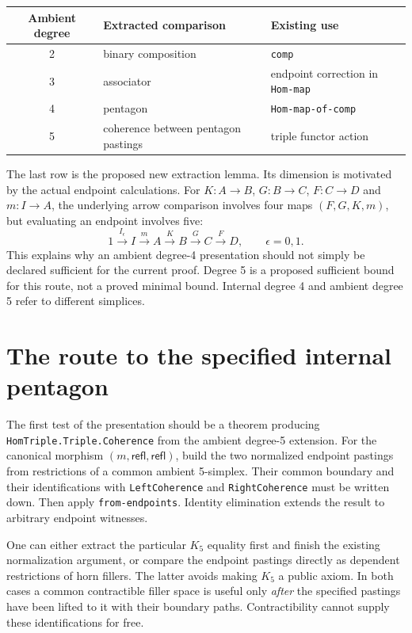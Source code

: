 \documentclass[11pt]{amsart}
\newcommand{\code}[1]{\nolinkurl{#1}}
\theoremstyle{definition}
\begin{document}
\begin{center}
\begin{tabular}{@{}cll@{}}
\toprule
Ambient degree & Extracted comparison & Existing use\\
\midrule
2 & binary composition & \code{comp}\\
3 & associator & endpoint correction in \code{Hom-map}\\
4 & pentagon & \code{Hom-map-of-comp}\\
5 & coherence between pentagon pastings & triple functor action\\
\bottomrule
\end{tabular}
\end{center}

The last row is the proposed new extraction lemma. Its dimension is
motivated by the actual endpoint calculations. For
$K:A\to B$, $G:B\to C$, $F:C\to D$ and $m:I\to A$, the underlying
arrow comparison involves four maps $(F,G,K,m)$, but evaluating an
endpoint involves five:
\[
 1\xrightarrow{I_\epsilon} I\xrightarrow{m}A
   \xrightarrow{K}B\xrightarrow{G}C\xrightarrow{F}D,
 \qquad \epsilon=0,1.
\]
This explains why an ambient degree-4 presentation should not simply be
declared sufficient for the current proof. Degree 5 is a proposed
sufficient bound for this route, not a proved minimal bound. Internal
degree 4 and ambient degree 5 refer to different simplices.

\section{The route to the specified internal pentagon}

The first test of the presentation should be a theorem producing
\code{HomTriple.Triple.Coherence} from the ambient degree-5 extension.
For the canonical morphism $(m,\mathsf{refl},\mathsf{refl})$, build the
two normalized endpoint pastings from restrictions of a common
ambient 5-simplex. Their common boundary and their identifications
with \code{LeftCoherence} and \code{RightCoherence} must be written
down. Then apply \code{from-endpoints}. Identity elimination extends
the result to arbitrary endpoint witnesses.

One can either extract the particular $K_5$ equality first and finish
the existing normalization argument, or compare the endpoint pastings
directly as dependent restrictions of horn fillers. The latter avoids
making $K_5$ a public axiom. In both cases a common contractible filler
space is useful only \emph{after} the specified pastings have been
lifted to it with their boundary paths. Contractibility cannot supply
these identifications for free.
\end{document}
